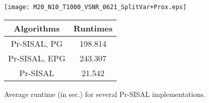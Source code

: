 \documentclass[10pt,twocolumn,twoside]{IEEEtran}
\makeatletter
\newcommand\figcaption{\def\@captype{figure}\caption}
\newcommand\tabcaption{\def\@captype{table}\caption}
\makeatother
\begin{document}
\begin{figure}[!hbt]
	\begin{minipage}[a]{.6\linewidth}
		\centering
		\texttt{[image: M20\_N10\_T1000\_VSNR\_0621\_SplitVar+Prox.eps]}
		\figcaption{Performance comparison of several Pr-SISAL implementations.}
		\label{fig:SV_vs_PG}
	\end{minipage}%
	\begin{minipage}[b]{.4\linewidth}
		\centering
		\tabcaption{Average runtime (in sec.) for several Pr-SISAL implementations.}
		\small
		\renewcommand{\arraystretch}{1.2}
		\begin{tabular}{c||c}
			\hline \hline
			Algorithms  & Runtimes \\
			\hline \hline
			Pr-SISAL, PG  & 198.814  \\
			\hline
			Pr-SISAL, EPG & 243.307  \\
			\hline
			Pr-SISAL      & 21.542 \\
			\hline\hline
		\end{tabular}
		\label{Tab:SV_vs_PG}
	\end{minipage}
\end{figure}


\end{document}
